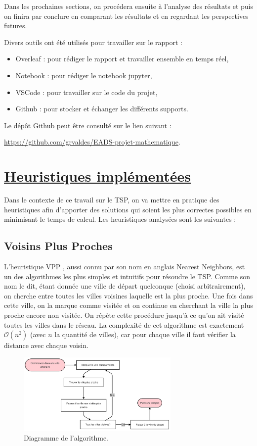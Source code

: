 \documentclass[a4paper,11pt,fleqn]{article}
\begin{document}
Dans les prochaines sections, on procédera ensuite à l’analyse des résultats et puis on finira par conclure en comparant les résultats et en regardant les perspectives futures.

Divers outils ont été utilisés pour travailler sur le rapport :
\begin{itemize}[noitemsep,topsep=5pt]
    \item Overleaf : pour rédiger le rapport et travailler ensemble en temps réel,
    \item Notebook : pour rédiger le notebook jupyter,
    \item VSCode : pour travailler sur le code du projet,
    \item Github : pour stocker et échanger les différents supports.
\end{itemize}

Le dépôt Github peut être consulté sur le lien suivant :

\noindent \url{https://github.com/grvaldes/EADS-projet-mathematique}.

\section*{\underline{Heuristiques implémentées}}
Dans le contexte de ce travail sur le TSP,  on va mettre en pratique des heuristiques afin d’apporter des solutions qui soient les plus correctes possibles en minimisant le temps de calcul.
Les heuristiques analysées sont les suivantes :
\subsection*{Voisins Plus Proches}
L'heuristique VPP \cite{article:nearest}, aussi connu par son nom en anglais Nearest Neighbors, est un des algorithmes les plus simples et intuitifs pour résoudre le TSP. Comme son nom le dit, étant donnée une ville de départ quelconque (choisi arbitrairement), on cherche entre toutes les villes voisines laquelle est la plus proche. Une fois dans cette ville, on la marque comme visitée et on continue en cherchant la ville la plus proche encore non visitée. On répète cette procédure jusqu'à ce qu'on ait visité toutes les villes dans le réseau. La complexité de cet algorithme est exactement $\mathcal{O}(n^2)$ (avec $n$ la quantité de villes), car pour chaque ville il faut vérifier la distance avec chaque voisin.

\begin{figure}[H]
    \centering
    \includegraphics[width=0.7\textwidth]{images/chart-nn.png}
    \caption{Diagramme de l'algorithme.}
    \label{fig:charte-nn}
\end{figure}
\end{document}
